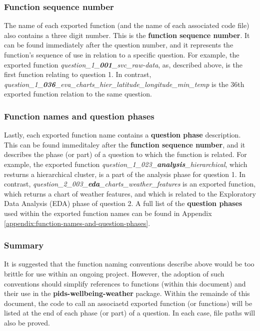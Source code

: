 \documentclass[12pt, oneside, openany]{book}
\begin{document}
\subsubsection*{Function sequence number}
The name of each exported function (and the name of each associated code file) also contains a three digit number. This is the \textbf{function sequence number}. It can be found immediately after the question number, and it represents the function's sequence of use in relation to a specific question. For example, the exported function \emph{question\_1\_\textbf{001}\_svc\_raw-data}, as, described above, is the first function relating to question 1. In contrast, \emph{question\_1\_\textbf{036}\_eva\_charts\_hier\_latitude\_longitude\_min\_temp} is the 36th exported function relation to the same question.

\subsubsection*{Function names and question phases}
Lastly, each exported function name contains a \textbf{question phase} description. This can be found immeditaley after the \textbf{function sequence number}, and it describes the phase (or part) of a question to which the function is related. For example, the exported function \emph{question\_1\_023\_\textbf{analysis}\_hierarchical}, which resturns a hierarchical cluster, is a part of the analysis phase for question 1. In contrast, \emph{question\_2\_003\_\textbf{eda}\_charts\_weather\_features} is an exported function, which returns a chart of weather features, and which is related to the Exploratory Data Analysis (EDA) phase of question 2. A full list of the \textbf{question phases} used within the exported function names can be found in Appendix \ref{appendix:function-names-and-question-phases}.

\subsubsection*{Summary}
It is suggested that the function naming conventions describe above would be too brittle for use within an ongoing project. However, the adoption of such conventions should simplify references to functions (within this document) and their use in the \textbf{pids-wellbeing-weather} package. Within the remainde of this document, the code to call an associaetd exported function (or functions) will be listed at the end of each phase (or part) of a question. In each case, file paths will also be proved.
\end{document}
